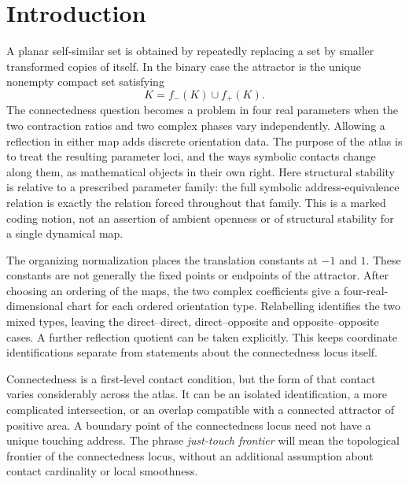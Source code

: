 \documentclass[11pt,a4paper]{article}
\theoremstyle{plain}
\theoremstyle{definition}
\theoremstyle{remark}
\begin{document}
\section{Introduction}\label{sec:introduction}
A planar self-similar set is obtained by repeatedly replacing a set by smaller
transformed copies of itself. In the binary case the attractor is the unique
nonempty compact set satisfying
\begin{equation}\label{eq:intro-ifs}
K=f_-(K)\cup f_+(K).
\end{equation}
The connectedness question becomes a problem in four real parameters when the
two contraction ratios and two complex phases vary independently. Allowing a
reflection in either map adds discrete orientation data. The purpose of the atlas
is to treat the resulting parameter loci, and the ways symbolic contacts change
along them, as mathematical objects in their own right.
Here structural stability is relative to a prescribed parameter family:
the full symbolic address-equivalence relation is exactly the relation forced
throughout that family. This is a marked coding notion, not an assertion of
ambient openness or of structural stability for a single dynamical map.

The organizing normalization places the translation constants at $-1$ and $1$.
These constants are not generally the fixed points or endpoints of the attractor.
After choosing an ordering of the maps, the two complex coefficients give a
four-real-dimensional chart for each ordered orientation type. Relabelling
identifies the two mixed types, leaving the direct--direct, direct--opposite and
opposite--opposite cases. A further reflection quotient can be taken explicitly.
This keeps coordinate identifications separate from statements about the
connectedness locus itself.

Connectedness is a first-level contact condition, but the form of that contact
varies considerably across the atlas. It can be an isolated identification,
a more complicated intersection, or an overlap compatible with a connected
attractor of positive area. A boundary point of the connectedness locus need not
have a unique touching address. The phrase \emph{just-touch frontier} will mean
the topological frontier of the connectedness locus, without an additional
assumption about contact cardinality or local smoothness.
\end{document}
